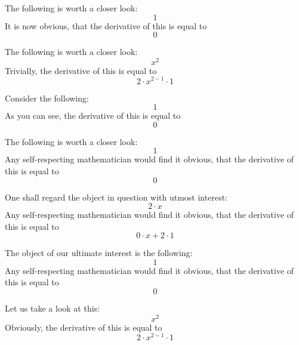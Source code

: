 \documentclass{article}
\begin{document}
The following is worth a closer look:
\begin{equation}
1 
\end{equation}
It is now obvious, that the derivative of this is equal to
\begin{equation}
0 
\end{equation}

The following is worth a closer look:
\begin{equation}
x ^{2 } 
\end{equation}
Trivially, the derivative of this is equal to
\begin{equation}
2 \cdot x ^{2 - 1 } \cdot 1 
\end{equation}

Consider the following:
\begin{equation}
1 
\end{equation}
As you can see, the derivative of this is equal to
\begin{equation}
0 
\end{equation}

The following is worth a closer look:
\begin{equation}
1 
\end{equation}
Any self-respecting mathematician would find it obvious, that the derivative of this is equal to
\begin{equation}
0 
\end{equation}

One shall regard the object in question with utmost interest:
\begin{equation}
2 \cdot x 
\end{equation}
Any self-respecting mathematician would find it obvious, that the derivative of this is equal to
\begin{equation}
0 \cdot x + 2 \cdot 1 
\end{equation}

The object of our ultimate interest is the following:
\begin{equation}
1 
\end{equation}
Any self-respecting mathematician would find it obvious, that the derivative of this is equal to
\begin{equation}
0 
\end{equation}

Let us take a look at this:
\begin{equation}
x ^{2 } 
\end{equation}
Obviously, the derivative of this is equal to
\begin{equation}
2 \cdot x ^{2 - 1 } \cdot 1 
\end{equation}
\end{document}
